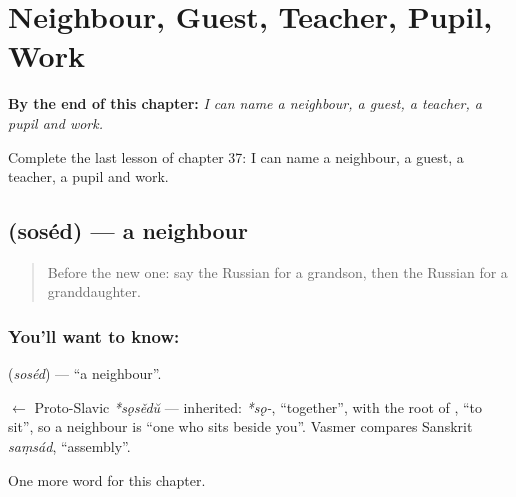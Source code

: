 
\chapter{Neighbour, Guest, Teacher, Pupil, Work}
\label{ch:ru-neighbour-guest-teacher-pupil-work}

\begin{chapteropening}
\textbf{By the end of this chapter:} \emph{I can name a neighbour, a guest, a teacher, a pupil and work.}

Complete the last lesson of chapter 37: I can name a neighbour, a guest, a teacher, a pupil and work.
\end{chapteropening}

\section[\texorpdfstring{\ru{сосед} (soséd)}{сосед (soséd)}]{ (soséd) — a neighbour}

\label{lesson:RU-C37-neighbour}



\begin{quote}
Before the new one: say the Russian for a grandson, then the Russian for a granddaughter.
\end{quote}

\subsection*{You'll want to know: }
\textbf{} (\emph{soséd}) — \textquotedblleft{}a neighbour\textquotedblright{}.

\begin{cousinweb}
\textbf{} $\leftarrow$ Proto-Slavic \emph{*sǫsědŭ} — inherited: \emph{*sǫ-}, \textquotedblleft{}together\textquotedblright{}, with the root of \emph{}, \textquotedblleft{}to sit\textquotedblright{}, so a neighbour is \textquotedblleft{}one who sits beside you\textquotedblright{}. Vasmer compares Sanskrit \emph{saṃsád}, \textquotedblleft{}assembly\textquotedblright{}.
\end{cousinweb}

\begin{grammarlens}[title={What you've built}]
One more word for this chapter.
\end{grammarlens}

